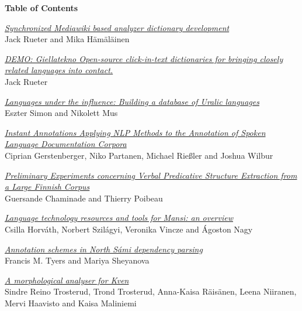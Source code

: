 \setlength{\parindent}{0in}
\setlength{\parskip}{2ex}

\begin{center}
  {\Large \bf Table of Contents}
\end{center}

\vspace*{0.5cm}



\hyperlink{page.1}{\em Synchronized Mediawiki based analyzer dictionary development}\samepage \\
\hspace*{7mm} Jack Rueter and Mika H\"{a}m\"{a}l\"{a}inen\dotfill {}

\hyperlink{page.8}{\em DEMO: Giellatekno Open-source click-in-text dictionaries for bringing closely related languages into contact.}\samepage \\
\hspace*{7mm} Jack Rueter\dotfill {}

\hyperlink{page.10}{\em Languages under the influence: Building a database of Uralic languages}\samepage \\
\hspace*{7mm} Eszter Simon and Nikolett Mus\dotfill {}

\hyperlink{page.25}{\em Instant Annotations \textendash Applying NLP Methods to the Annotation of Spoken Language Documentation Corpora}\samepage \\
\hspace*{7mm} Ciprian Gerstenberger, Niko Partanen, Michael Rie{\ss}ler and Joshua Wilbur\dotfill {}

\hyperlink{page.37}{\em Preliminary Experiments concerning Verbal Predicative Structure Extraction from a Large Finnish Corpus}\samepage \\
\hspace*{7mm} Guersande Chaminade and Thierry Poibeau\dotfill {}

\hyperlink{page.56}{\em Language technology resources and tools for Mansi: an overview}\samepage \\
\hspace*{7mm} Csilla Horv\'{a}th, Norbert Szil\'{a}gyi, Veronika Vincze and \'{A}goston Nagy\dotfill {}

\hyperlink{page.66}{\em Annotation schemes in North S\'{a}mi dependency parsing}\samepage \\
\hspace*{7mm} Francis M. Tyers and Mariya Sheyanova\dotfill {}

\hyperlink{page.76}{\em A morphological analyser for Kven}\samepage \\
\hspace*{7mm} Sindre Reino Trosterud, Trond Trosterud, Anna-Kaisa R\"{a}is\"{a}nen, Leena Niiranen, Mervi Haavisto and Kaisa Maliniemi\dotfill {}

